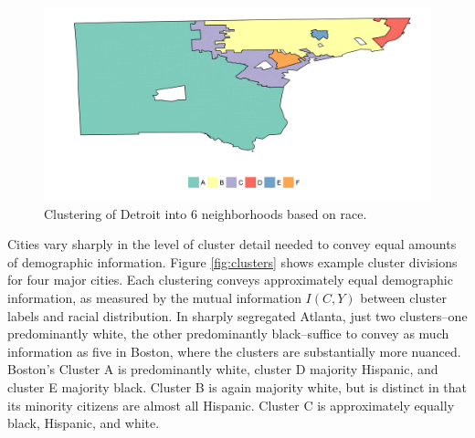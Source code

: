 	\begin{figure}
		\centering
		\includegraphics[width=\textwidth]{figs/example_cluster_map.png}
		\caption{Clustering of Detroit into 6 neighborhoods based on race.}
		\label{fig:cluster_map}
	\end{figure}		

	Cities vary sharply in the level of cluster detail needed to convey equal amounts of demographic information. Figure \ref{fig:clusters} shows example cluster divisions for four major cities. Each clustering conveys approximately equal demographic information, as measured by the mutual information $I(C,Y)$ between cluster labels and racial distribution. In sharply segregated Atlanta, just two clusters--one predominantly white, the other predominantly black--suffice to convey as much information as five in Boston, where the clusters are substantially more nuanced. Boston's Cluster A is predominantly white, cluster D majority Hispanic, and cluster E majority black. Cluster B is again majority white, but is distinct in that its minority citizens are almost all Hispanic. Cluster C is approximately equally black, Hispanic, and white. 

